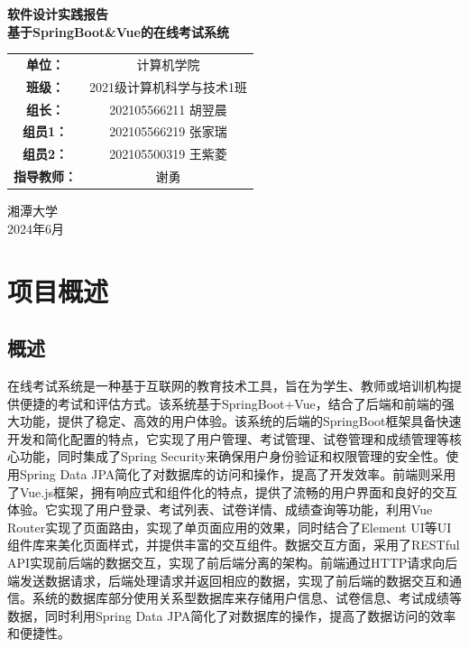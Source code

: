 \documentclass{article}
\begin{document}
\begin{titlepage}
    \begin{center}
        \bfseries\Huge{软件设计实践报告}\\
        \vspace{0.5cm}
        \bfseries\Large{基于SpringBoot\&Vue的在线考试系统}
        \vspace{5cm}
        \begin{center}\Large\linespread{2}
        \renewcommand\arraystretch{1.6}
        \begin{tabular}{cc}
            \bfseries{单位：} & 计算机学院\\ \cline{2-2}
            \bfseries{班级：} & 2021级计算机科学与技术1班\\ \cline{2-2}
            \bfseries{组长：} & 202105566211 胡翌晨\\ \cline{2-2}
            \bfseries{组员1：} & 202105566219 张家瑞\\ \cline{2-2}
            \bfseries{组员2：} & 202105500319 王紫菱\\ \cline{2-2}
            \bfseries{指导教师：} & 谢勇\\ \cline{2-2}
        \end{tabular}
        \end{center}
        \vspace{2.5cm}
        \Large{湘潭大学\\2024年6月}
    \end{center}
    \thispagestyle{empty}
    \restoregeometry
\end{titlepage}

\newpage
\tableofcontents
\newpage

\section{项目概述}

\subsection{概述}
在线考试系统是一种基于互联网的教育技术工具，旨在为学生、教师或培训机构提供便捷的考试和评估方式。该系统基于SpringBoot+Vue，结合了后端和前端的强大功能，提供了稳定、高效的用户体验。该系统的后端的SpringBoot框架具备快速开发和简化配置的特点，它实现了用户管理、考试管理、试卷管理和成绩管理等核心功能，同时集成了Spring Security来确保用户身份验证和权限管理的安全性。使用Spring Data JPA简化了对数据库的访问和操作，提高了开发效率。前端则采用了Vue.js框架，拥有响应式和组件化的特点，提供了流畅的用户界面和良好的交互体验。它实现了用户登录、考试列表、试卷详情、成绩查询等功能，利用Vue Router实现了页面路由，实现了单页面应用的效果，同时结合了Element UI等UI组件库来美化页面样式，并提供丰富的交互组件。数据交互方面，采用了RESTful API实现前后端的数据交互，实现了前后端分离的架构。前端通过HTTP请求向后端发送数据请求，后端处理请求并返回相应的数据，实现了前后端的数据交互和通信。系统的数据库部分使用关系型数据库来存储用户信息、试卷信息、考试成绩等数据，同时利用Spring Data JPA简化了对数据库的操作，提高了数据访问的效率和便捷性。
\end{document}
